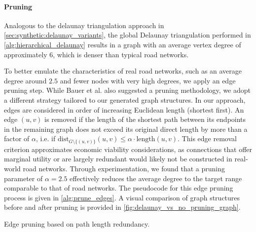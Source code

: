 \paragraph{Pruning}
\label{sec:synthetic:hierarchical_delaunay:pruning}


Analogous to the delaunay triangulation approach in \cref{sec:synthetic:delaunay_variants}, the global Delaunay triangulation performed in \cref{alg:hierarchical_delaunay} results in a graph with an average vertex degree of approximately 6, which is denser than typical road networks.

To better emulate the characteristics of real road networks, such as an average degree around \(2.5\) and fewer nodes with very high degrees, we apply an edge pruning step.
While Bauer et al. \cite{hutchison_synthetic_2010} also suggested a pruning methodology, we adopt a different strategy tailored to our generated graph structures.
In our approach, edges are considered in order of increasing Euclidean length (shortest first).
An edge \((u,v)\) is removed if the length of the shortest path between its endpoints in the remaining graph does not exceed its original direct length by more than a factor of \(\alpha\), i.e. if \( \text{dist}_{G \setminus \{(u,v)\}}(u,v) \le \alpha \cdot \text{length}(u,v) \).
This edge removal criterion approximates economic viability considerations, as connections that offer marginal utility or are largely redundant would likely not be constructed in real-world road networks.
Through experimentation, we found that a pruning parameter of \(\alpha = 2.5\) effectively reduces the average degree to the target range comparable to that of road networks.
The pseudocode for this edge pruning process is given in \cref{alg:prune_edges}.
A visual comparison of graph structures before and after pruning is provided in \cref{fig:delaunay_vs_no_pruning_graph}.

\begin{algorithm}[tbhp]
	\BlankLine
	\caption{Edge pruning based on path length redundancy.}
	\label{alg:prune_edges}
\end{algorithm}

